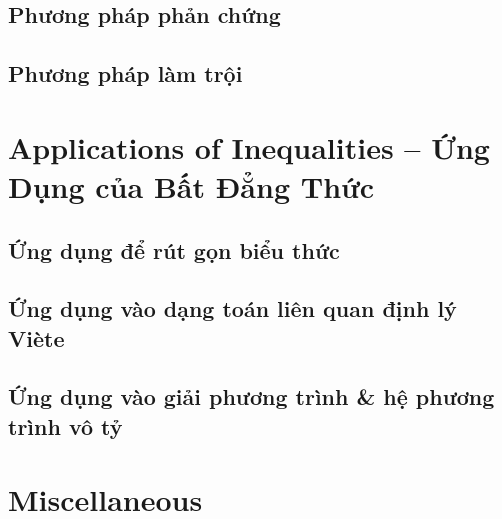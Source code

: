 \documentclass{article}
\begin{document}
\subsection{Phương pháp phản chứng}

\subsection{Phương pháp làm trội}


\section{Applications of Inequalities -- Ứng Dụng của Bất Đẳng Thức}

\subsection{Ứng dụng để rút gọn biểu thức}

\subsection{Ứng dụng vào dạng toán liên quan định lý Vi\`ete}

\subsection{Ứng dụng vào giải phương trình \& hệ phương trình vô tỷ}


\section{Miscellaneous}


\printbibliography[heading=bibintoc]
\end{document}
